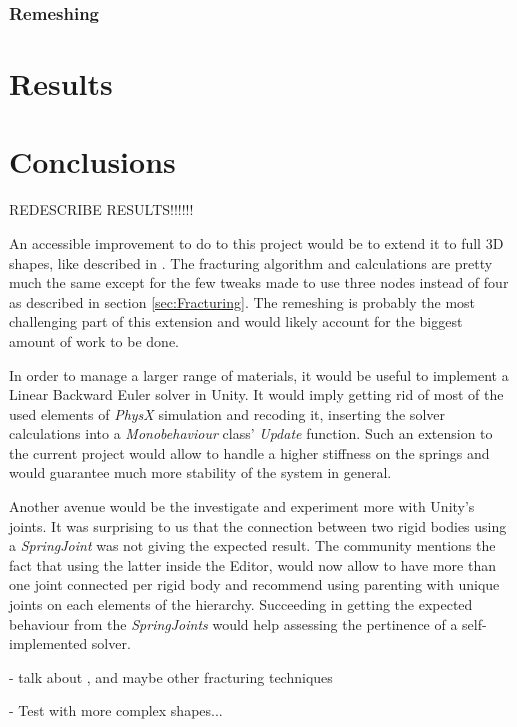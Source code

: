 \documentclass[tog]{acmsiggraph}
\begin{document}
\subsubsection{Remeshing}

\section{Results}



\section{Conclusions}

REDESCRIBE RESULTS!!!!!!

An accessible improvement to do to this project would be to extend it to full 3D shapes, like described in \cite{Obrien:1999:GMA}. The fracturing algorithm and calculations are pretty much the same except for the few tweaks made to use three nodes instead of four as described in section \ref{sec:Fracturing}. The remeshing is probably the most challenging part of this extension and would likely account for the biggest amount of work to be done. 

In order to manage a larger range of materials, it would be useful to implement a Linear Backward Euler solver in Unity. It would imply getting rid of most of the used elements of \textit{PhysX} simulation and recoding it, inserting the solver calculations into a \textit{Monobehaviour} class' \textit{Update} function. Such an extension to the current project would allow to handle a higher stiffness on the springs and would guarantee much more stability of the system in general. 

Another avenue would be the investigate and experiment more with Unity's joints. It was surprising to us that the connection between two rigid bodies using a \textit{SpringJoint} was not giving the expected result. The community mentions the fact that using the latter inside the Editor, would now allow to have more than one joint connected per rigid body and recommend using parenting with unique joints on each elements of the hierarchy. Succeeding in getting the expected behaviour from the \textit{SpringJoints} would help assessing the pertinence of a self-implemented solver.  

- talk about \cite{Parker:2009:RTD}, \cite{Rivers:2007:FFL} and maybe other fracturing techniques

- Test with more complex shapes... 
\end{document}
